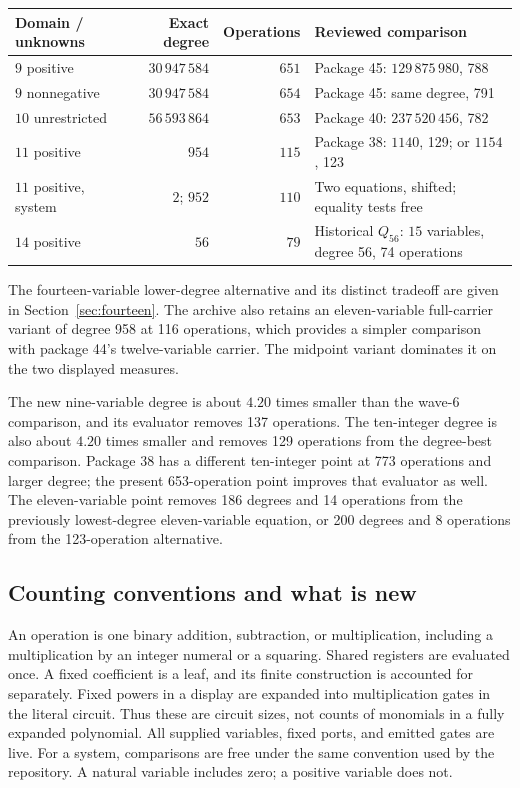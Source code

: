 \documentclass[11pt,a4paper]{article}
\theoremstyle{definition}
\theoremstyle{remark}
\numberwithin{equation}{section}
\begin{document}
\begin{center}
\small
\begin{tabular}{@{}p{34mm}rrp{48mm}@{}}
\toprule
Domain / unknowns & Exact degree & Operations & Reviewed comparison\\
\midrule
$9$ positive & $30\,947\,584$ & $651$ & Package 45: $129\,875\,980$, 788\\
$9$ nonnegative & $30\,947\,584$ & $654$ & Package 45: same degree, 791\\
$10$ unrestricted & $56\,593\,864$ & $653$ & Package 40: $237\,520\,456$, 782\\
$11$ positive & $954$ & $115$ & Package 38: $1140$, 129; or $1154$, 123\\
$11$ positive, system & $2$; $952$ & $110$ & Two equations, shifted; equality tests free\\
$14$ positive & $56$ & $79$ & Historical $Q_{56}$: $15$ variables, degree 56, 74 operations\\
\bottomrule
\end{tabular}
\end{center}

The fourteen-variable lower-degree alternative and its distinct
tradeoff are given in Section~\ref{sec:fourteen}. The archive also retains
an eleven-variable full-carrier variant of degree 958 at 116 operations,
which provides a simpler comparison with package 44's twelve-variable
carrier. The midpoint variant dominates it on the two displayed measures.

The new nine-variable degree is about $4.20$ times smaller than the
wave-6 comparison, and its evaluator removes 137 operations. The ten-integer
degree is also about $4.20$ times smaller and removes 129 operations
from the degree-best comparison. Package 38 has a different ten-integer
point at 773 operations and larger degree; the present 653-operation
point improves that evaluator as well. The eleven-variable point removes
186 degrees and 14 operations from the previously lowest-degree
eleven-variable equation, or 200 degrees and 8 operations from the
123-operation alternative.

\subsection{Counting conventions and what is new}

An operation is one binary addition, subtraction, or multiplication,
including a multiplication by an integer numeral or a squaring. Shared
registers are evaluated once. A fixed coefficient is a leaf, and its
finite construction is accounted for separately. Fixed powers in a
display are expanded into multiplication gates in the literal circuit.
Thus these are circuit sizes, not counts of monomials in a fully expanded
polynomial. All supplied variables, fixed ports, and emitted gates are live.
For a system, comparisons are free under the same convention used by the
repository. A natural variable includes zero; a positive variable does not.
\end{document}
